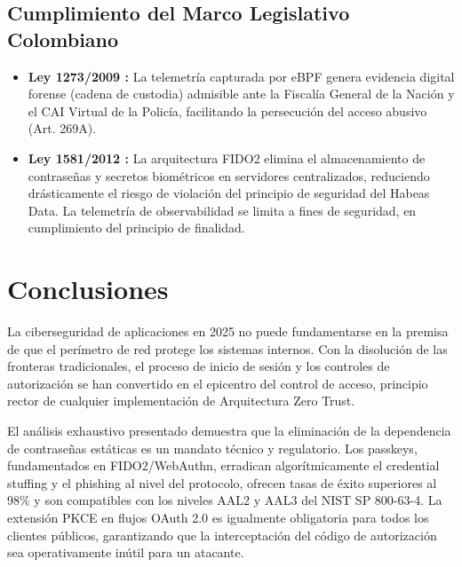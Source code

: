 \documentclass[12pt, a4paper]{article}
\begin{document}
\subsection{Cumplimiento del Marco Legislativo Colombiano}

\begin{itemize}[noitemsep]
  \item \textbf{Ley 1273/2009 \cite{ley1273}:} La telemetría capturada por
        eBPF genera evidencia digital forense (cadena de custodia) admisible
        ante la Fiscalía General de la Nación y el CAI Virtual de la Policía,
        facilitando la persecución del acceso abusivo (Art. 269A).
  \item \textbf{Ley 1581/2012 \cite{ley1581}:} La arquitectura FIDO2 elimina
        el almacenamiento de contraseñas y secretos biométricos en servidores
        centralizados, reduciendo drásticamente el riesgo de violación del
        principio de seguridad del Habeas Data. La telemetría de observabilidad
        se limita a fines de seguridad, en cumplimiento del principio de finalidad.
\end{itemize}

\section{Conclusiones}

La ciberseguridad de aplicaciones en 2025 no puede fundamentarse en la premisa
de que el perímetro de red protege los sistemas internos. Con la disolución de
las fronteras tradicionales, el proceso de inicio de sesión y los controles de
autorización se han convertido en el epicentro del control de acceso, principio
rector de cualquier implementación de Arquitectura Zero Trust.

El análisis exhaustivo presentado demuestra que la eliminación de la dependencia
de contraseñas estáticas es un mandato técnico y regulatorio. Los passkeys,
fundamentados en FIDO2/WebAuthn, erradican algorítmicamente el credential stuffing
y el phishing al nivel del protocolo, ofrecen tasas de éxito superiores al 98\%
y son compatibles con los niveles AAL2 y AAL3 del NIST SP 800-63-4. La extensión
PKCE en flujos OAuth 2.0 es igualmente obligatoria para todos los clientes públicos,
garantizando que la interceptación del código de autorización sea operativamente
inútil para un atacante.
\end{document}

